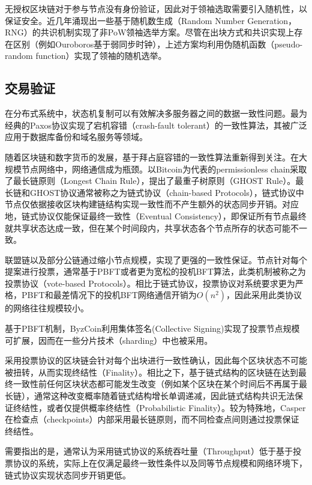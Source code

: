 无授权区块链对于参与节点没有身份验证，因此对于领袖选取需要引入随机性，以保证安全\cite{pass2017rethinking}。近几年涌现出一些基于随机数生成（Random Number Generation，RNG）的共识机制实现了非PoW领袖选举方案\cite{gilad2017algorand,david2018ouroboros,hanke2018difinity}。尽管在出块方式和共识实现上存在区别（例如Ouroboros基于弱同步时钟），上述方案均利用伪随机函数（pseudo-random function）实现了领袖的随机选举。


\subsection{交易验证}
\label{subsec:intro_tx_verification}
在分布式系统中，状态机复制可以有效解决多服务器之间的数据一致性问题\cite{schneider1990implementing}。最为经典的Paxos协议实现了宕机容错（crash-fault tolerant）的一致性算法\cite{lamport2001paxos}，其被广泛应用于数据库备份和域名服务等领域\cite{burrows2006chubby,chang2008bigtable}。

随着区块链和数字货币的发展，基于拜占庭容错的一致性算法重新得到关注。在大规模节点网络中，网络通信成为瓶颈。以Bitcoin为代表的permissionless chain采取了最长链原则（Longest Chain Rule）\cite{nakamoto2008bitcoin}，\cite{sompolinsky2015secure}提出了最重子树原则（GHOST Rule）。最长链和GHOST协议通常被称之为链式协议（chain-based Protocols），链式协议中节点仅依据接收区块构建链结构实现一致性而不产生额外的状态同步开销。对应地，链式协议仅能保证最终一致性（Eventual Consistency），即保证所有节点最终就共享状态达成一致，但在某个时间段内，共享状态各个节点所存的状态可能不一致。

联盟链以及部分公链通过缩小节点规模，实现了更强的一致性保证。节点针对每个提案进行投票，通常基于PBFT\cite{castro1999practical}或者更为宽松的投机BFT算法\cite{kotla2007zyzzyva}，此类机制被称之为投票协议（vote-based Protocols）。相比于链式协议，投票协议对系统要求更为严格，PBFT和最差情况下的投机BFT网络通信开销为$O(n^2)$，因此采用此类协议的网络往往规模较小。

基于PBFT机制，ByzCoin\cite{kogias2016enhancing}利用集体签名(Collective Signing)实现了投票节点规模可扩展，因而在一些分片技术（sharding）中也被采用\cite{kokoris2018omniledger}。

采用投票协议的区块链会针对每个出块进行一致性确认，因此每个区块状态不可能被扭转，从而实现终结性（Finality）。相比之下，基于链式结构的区块链在达到最终一致性前任何区块状态都可能发生改变（例如某个区块在某个时间后不再属于最长链），通常这种改变概率随着链式结构增长单调递减\cite{nakamoto2008bitcoin}，因此链式结构共识无法保证终结性，或者仅提供概率终结性（Probabilistic Finality）。较为特殊地，Casper\cite{buterin2017casper}在检查点（checkpoints）内部采用最长链原则，而不同检查点间则通过投票保证终结性。

需要指出的是，通常认为采用链式协议的系统吞吐量（Throughput）低于基于投票协议的系统，实际上在仅满足最终一致性条件以及同等节点规模和网络环境下，链式协议实现状态同步开销更低。








